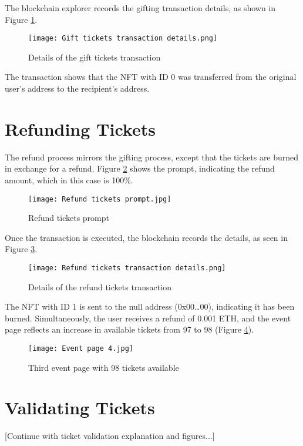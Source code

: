 The blockchain explorer records the gifting transaction details, as shown in
Figure \ref{fig:gift_tickets_transaction_details}.

\begin{figure}[H]
    \texttt{[image: Gift tickets transaction details.png]}
    \centering
    \caption{Details of the gift tickets transaction}
    \label{fig:gift_tickets_transaction_details}
\end{figure}

The transaction shows that the NFT with ID 0 was transferred from the original
user's address to the recipient's address.

\section{Refunding Tickets}
\label{sec:refund_tickets}

The refund process mirrors the gifting process, except that the tickets are
burned in exchange for a refund. Figure \ref{fig:refund_tickets_prompt} shows
the prompt, indicating the refund amount, which in this case is 100\%.

\begin{figure}[H]
    \texttt{[image: Refund tickets prompt.jpg]}
    \centering
    \caption{Refund tickets prompt}
    \label{fig:refund_tickets_prompt}
\end{figure}

Once the transaction is executed, the blockchain records the details, as seen
in Figure \ref{fig:refund_tickets_transaction_details}.

\begin{figure}[H]
    \texttt{[image: Refund tickets transaction details.png]}
    \centering
    \caption{Details of the refund tickets transaction}
    \label{fig:refund_tickets_transaction_details}
\end{figure}

The NFT with ID 1 is sent to the null address (0x00\dots00), indicating it has
been burned. Simultaneously, the user receives a refund of 0.001 ETH, and the
event page reflects an increase in available tickets from 97 to 98 (Figure
\ref{fig:refund_tickets_event}).

\begin{figure}[H]
    \texttt{[image: Event page 4.jpg]}
    \centering
    \caption{Third event page with 98 tickets available}
    \label{fig:refund_tickets_event}
\end{figure}

\section{Validating Tickets}
\label{sec:validate_tickets}

[Continue with ticket validation explanation and figures...]
